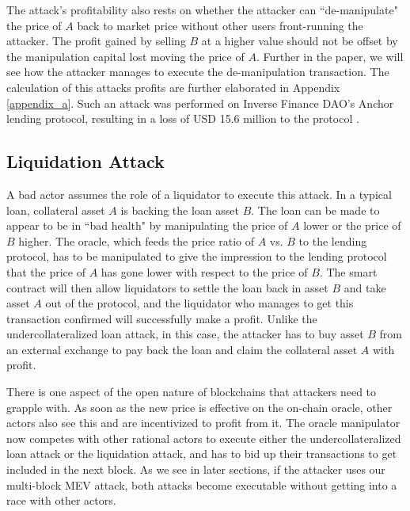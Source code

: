 The attack's profitability also rests on whether the attacker can ``de-manipulate" the price of $A$ back to market price without other users front-running the attacker. The profit gained by selling $B$ at a higher value should not be offset by the manipulation capital lost moving the price of $A$. Further in the paper, we will see how the attacker manages to execute the de-manipulation transaction. The calculation of this attacks profits are further elaborated in Appendix \ref{appendix_a}. Such an attack was performed on Inverse Finance DAO's Anchor lending protocol, resulting in a loss of USD 15.6 million to the protocol \cite{inverse_finance_hack}.

\subsection{Liquidation Attack\label{SectionLiquidationAttack}}
A bad actor assumes the role of a liquidator to execute this attack. In a typical loan, collateral asset $A$ is backing the loan asset $B$. The loan can be made to appear to be in ``bad health" by manipulating the price of $A$ lower or the price of $B$ higher. The oracle, which feeds the price ratio of $A$ vs. $B$ to the lending protocol, has to be manipulated to give the impression to the lending protocol that the price of $A$ has gone lower with respect to the price of $B$. The smart contract will then allow liquidators to settle the loan back in asset $B$ and take asset $A$ out of the protocol, and the liquidator who manages to get this transaction confirmed will successfully make a profit. Unlike the undercollateralized loan attack, in this case, the attacker has to buy asset $B$ from an external exchange to pay back the loan and claim the collateral asset $A$ with profit.

There is one aspect of the open nature of blockchains that attackers need to grapple with. As soon as the new price is effective on the on-chain oracle, other actors also see this and are incentivized to profit from it. The oracle manipulator now competes with other rational actors to execute either the undercollateralized loan attack or the liquidation attack, and has to bid up their transactions to get included in the next block. As we see in later sections, if the attacker uses our multi-block MEV attack, both attacks become executable without getting into a race with other actors.

